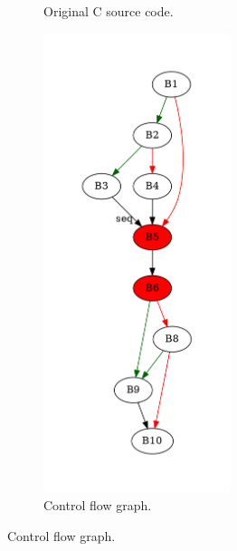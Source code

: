 \begin{figure}[htbp]
	\centering
	\begin{subfigure}[b]{0.30\textwidth}
		\centering
		
		\caption{Original C source code.}
	\end{subfigure}
	\begin{subfigure}[b]{0.50\textwidth}
		\centering
		\includegraphics[width=0.6\textwidth]{inc/appendices/examples/hammock/counter-example/jump-threading-and-short-circuit/jump-threading-and-short-circuit_jump/f_0004a.png}
		\caption{Control flow graph.}
	\end{subfigure}
\end{figure}

